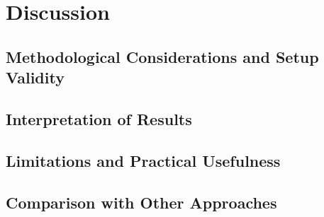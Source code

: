 



\section{Discussion}  \label{sec:discussion}


\subsection{Methodological Considerations and Setup Validity}

\subsection{Interpretation of Results}

\subsection{Limitations and Practical Usefulness}

\subsection{Comparison with Other Approaches}





